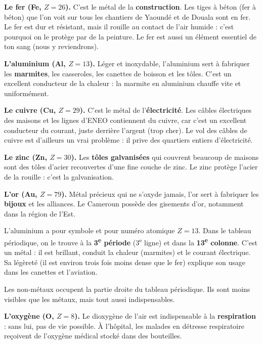 \documentclass[11pt]{article}
\newcommand{\cle}[1]{{\popxbold\color{popdark}#1}}
\newcounter{popsec}
\newcounter{popsub}
\newcommand{\courssub}[1]{%
  \stepcounter{popsub}%
  \par\vspace{9pt}\noindent{\popxbold\fontsize{11.5}{13}\selectfont\color{popink}{\color{poporange}\thepopsec.\thepopsub}\hspace{6pt}#1}\par\nopagebreak\vspace{4pt}
}
\begin{document}
\textbf{Le fer (Fe, $Z = 26$).} C'est le métal de la \textbf{construction}. Les tiges à béton (fer à béton) que l'on voit sur tous les chantiers de Yaoundé et de Douala sont en fer. Le fer est dur et résistant, mais il rouille au contact de l'air humide : c'est pourquoi on le protège par de la peinture. Le fer est aussi un élément essentiel de ton sang (nous y reviendrons).

\textbf{L'aluminium (Al, $Z = 13$).} Léger et inoxydable, l'aluminium sert à fabriquer les \textbf{marmites}, les casseroles, les canettes de boisson et les tôles. C'est un excellent conducteur de la chaleur : la marmite en aluminium chauffe vite et uniformément.

\textbf{Le cuivre (Cu, $Z = 29$).} C'est le métal de l'\textbf{électricité}. Les câbles électriques des maisons et les lignes d'ENEO contiennent du cuivre, car c'est un excellent conducteur du courant, juste derrière l'argent (trop cher). Le vol des câbles de cuivre est d'ailleurs un vrai problème : il prive des quartiers entiers d'électricité.

\textbf{Le zinc (Zn, $Z = 30$).} Les \textbf{tôles galvanisées} qui couvrent beaucoup de maisons sont des tôles d'acier recouvertes d'une fine couche de zinc. Le zinc protège l'acier de la rouille : c'est la galvanisation.

\textbf{L'or (Au, $Z = 79$).} Métal précieux qui ne s'oxyde jamais, l'or sert à fabriquer les \textbf{bijoux} et les alliances. Le Cameroun possède des gisements d'or, notamment dans la région de l'Est.

\begin{exemplebox}
L'aluminium a pour symbole  et pour numéro atomique $Z = 13$. Dans le tableau périodique, on le trouve à la \textbf{3\textsuperscript{e} période} (3\textsuperscript{e} ligne) et dans la \textbf{13\textsuperscript{e} colonne}. C'est un \cle{métal} : il est brillant, conduit la chaleur (marmites) et le courant électrique. Sa légèreté (il est environ trois fois moins dense que le fer) explique son usage dans les canettes et l'aviation.
\end{exemplebox}

\courssub{Les éléments non métalliques usuels}

Les non-métaux occupent la partie droite du tableau périodique. Ils sont moins visibles que les métaux, mais tout aussi indispensables.

\textbf{L'oxygène (O, $Z = 8$).} Le dioxygène  de l'air est indispensable à la \textbf{respiration} : sans lui, pas de vie possible. À l'hôpital, les malades en détresse respiratoire reçoivent de l'oxygène médical stocké dans des bouteilles.
\end{document}

